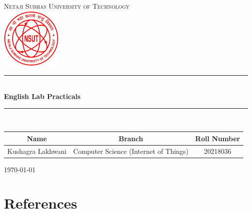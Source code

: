 \documentclass{article}
\begin{document}
\begin{titlepage}

  \newcommand{\HRule}{\rule{\linewidth}{0.5mm}}

  \center
  \textsc{\LARGE Netaji Subhas University of Technology}\\[1.5cm]

  \includegraphics[width=30mm]{NSUT.png}\\[1.0cm]

  \HRule \\[0.7cm]
  { \huge \bfseries English Lab Practicals}\\[0.4cm]
  \HRule \\[1.5cm]



  \begin{table}[H]
    \centering
    \begin{tabular}{ccc}
      Name              & Branch                                & Roll Number \\
      \hline
      Kushagra Lakhwani & Computer Science (Internet of Things) & 20218036    \\
    \end{tabular}
  \end{table}


  \vfill
  {\large \today}\\[2cm]



\end{titlepage}

\newpage

\tableofcontents

\pagebreak


\newpage

\section{References}

\begingroup
\renewcommand{\section}[2]{}
\begin{thebibliography}{10}

  \bigskip


\end{thebibliography}
\endgroup
\end{document}

